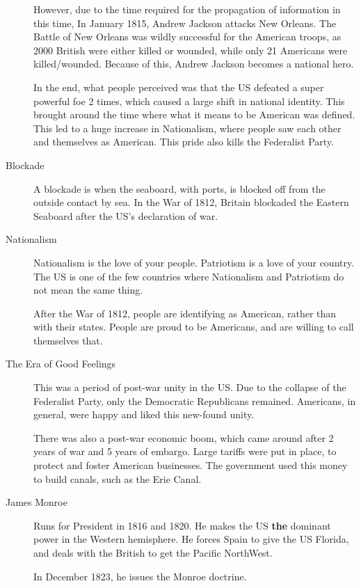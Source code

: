 \begin{description}
  However, due to the time required for the propagation of information in this time, In January 1815, Andrew Jackson attacks New Orleans.
  The Battle of New Orleans was wildly successful for the American troops, as 2000 British were either killed or wounded, while only 21 Americans were killed/wounded.
  Because of this, Andrew Jackson becomes a national hero.

  In the end, what people perceived was that the US defeated a super powerful foe 2 times, which caused a large shift in national identity.
  This brought around the time where what it means to be American was defined.
  This led to a huge increase in Nationalism, where people saw each other and themselves as American.
  This pride also kills the Federalist Party.

\item[Blockade] A blockade is when the seaboard, with ports, is blocked off from the outside contact by sea.
  In the War of 1812, Britain blockaded the Eastern Seaboard after the US's declaration of war.

\item[Nationalism] Nationalism is the love of your people.
  Patriotism is a love of your country.
  The US is one of the few countries where Nationalism and Patriotism do not mean the same thing.

  After the War of 1812, people are identifying as American, rather than with their states.
  People are proud to be Americans, and are willing to call themselves that.

\item[The Era of Good Feelings] This was a period of post-war unity in the US.\@
  Due to the collapse of the Federalist Party, only the Democratic Republicans remained.
  Americans, in general, were happy and liked this new-found unity.

  There was also a post-war economic boom, which came around after 2 years of war and 5 years of embargo.
  Large tariffs were put in place, to protect and foster American businesses.
  The government used this money to build canals, such as the Erie Canal.

\item[James Monroe] Runs for President in 1816 and 1820.
  He makes the US \textbf{the} dominant power in the Western hemisphere.
  He forces Spain to give the US Florida, and deals with the British to get the Pacific NorthWest.

  In December 1823, he issues the Monroe doctrine.


\end{description}
